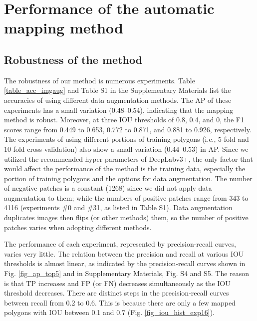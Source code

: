 \documentclass[authoryear,preprint,review,12pt]{elsarticle}
\begin{document}
\section{Performance of the automatic mapping method}
\label{sec_performance}

\subsection{Robustness of the method}
\label{subsec_robustness}

The robustness of our method is  numerous experiments. Table \ref{table_acc_imgaug} and Table S1 in the Supplementary Materials list the accuracies of using different data augmentation methods. The AP of these experiments has a small variation (0.48--0.54), indicating that the mapping method is robust. Moreover, at three IOU thresholds of 0.8, 0.4, and 0, the F1 scores range from 0.449 to 0.653, 0.772 to 0.871, and 0.881 to 0.926, respectively. The experiments of using different portions of training polygons (i.e., 5-fold and 10-fold cross-validation) also show a small variation (0.44--0.53) in AP. Since we utilized the recommended hyper-parameters of DeepLabv3+, the only factor that would affect the performance of the method is the training data, especially the portion of training polygons and the options for data augmentation. The number of negative patches is a constant (1268) since we did not apply data augmentation to them; while the numbers of positive patches range from 343 to 4116 (experiments \#0 and \#31, as listed in Table S1). Data augmentation duplicates images then flips (or other methods) them, so the number of positive patches varies when adopting different methods.

The performance of each experiment, represented by precision-recall curves, varies very little. The relation between the precision and recall at various IOU thresholds is almost linear, as indicated by the precision-recall curves shown in Fig. \ref{fig_ap_top5} and  in Supplementary Materials, Fig. S4 and S5. The reason is that TP increases and FP (or FN) decreases simultaneously as the IOU threshold decreases. There are distinct steps in the precision-recall curves between recall from 0.2 to 0.6. This is because there are only a few mapped polygons with IOU between 0.1 and 0.7 (Fig. \ref{fig_iou_hist_exp16}).
\end{document}
